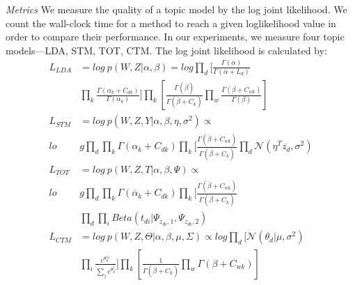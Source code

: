 \documentclass[10pt,journal,cspaper,compsoc]{IEEEtran}
\begin{document}
\noindent
{\large \em Metrics}
We measure the quality of a topic model by the log
joint likelihood.
We count the wall-clock time for a method to reach a given loglikelihood value in order to compare their performance.
In our experiments, we measure four topic models---LDA,
STM, TOT, CTM. The log joint likelihood is calculated
by:
\begin{align*}
L_{LDA} &= log~p(W, Z|\alpha, \beta) = log \prod_d [\frac{\Gamma(\overline \alpha)}{\Gamma(\overline \alpha + L_d)}\\
&\prod_k \frac{\Gamma(\alpha_k + C_{dk})}{\Gamma(\alpha_k)}]
 \prod_k [\frac{\Gamma(\overline \beta)}{\Gamma(\overline \beta + C_k)} \prod_w \frac{\Gamma(\beta + C_{wk})}{\Gamma(\beta)}]\\
L_{STM} &= log~p(W, Z, Y|\alpha, \beta, \eta, \sigma^2) \propto \\
lo&g \prod_d \prod_k \Gamma(\alpha_k + C_{dk}) \prod_k [\frac{\Gamma(\overline \beta + C_{wk})}{\Gamma(\overline \beta + C_k)} \prod_d \mathcal{N}(\eta^T\overline{z_d}, \sigma^2)\\
L_{TOT} &= log~p(W, Z, T|\alpha, \beta, \Psi) \propto \\
lo&g \prod_d \prod_k \Gamma(\overline \alpha_k + C_{dk})
 \prod_k [\frac{\Gamma(\overline \beta + C_{wk})}{\Gamma(\overline \beta + C_k)} \\
 &\prod_d \prod_{i} Beta(t_{di}|\Psi_{z_{di},1}, \Psi_{z_{di},2})\\
L_{CTM} &= log~p(W, Z, \Theta |\alpha, \beta, \mu, \Sigma) \propto log \prod_d [\mathcal{N}(\theta_d|\mu,\sigma^2)\\
&\prod_i \frac{e^{\theta_d^{z_{di}}}}{\sum_j{e^{\theta_d^j}}}]
\prod_k [\frac{1}{\Gamma(\overline \beta + C_k)} \prod_w \Gamma(\beta + C_{wk})]
\end{align*}\\
\end{document}
